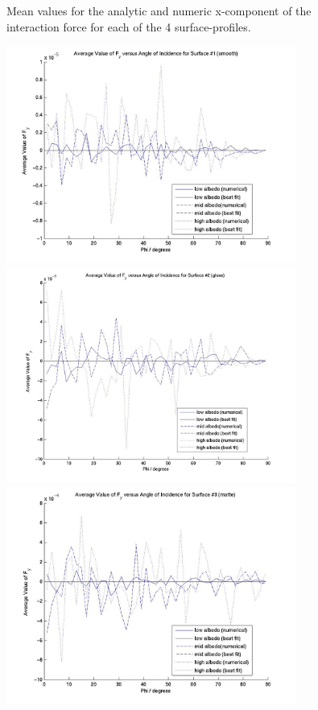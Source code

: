 \begin{description}
\begin{figure}[!ht]
        \caption{Mean values for the analytic and numeric x-component of
                the interaction force for each of the 4
                surface-profiles.}
        \label{fig:ivv_sda_f_vector_diffs_x}
      \end{figure}

      \begin{figure}[!ht]
        \includegraphics[width=95mm]{figs/sda/F__y_diff_smooth.jpg}
        \includegraphics[width=95mm]{figs/sda/F__y_diff__gloss.jpg}
        \includegraphics[width=95mm]{figs/sda/F__y_diff__matte.jpg}

\end{figure}
\end{description}
